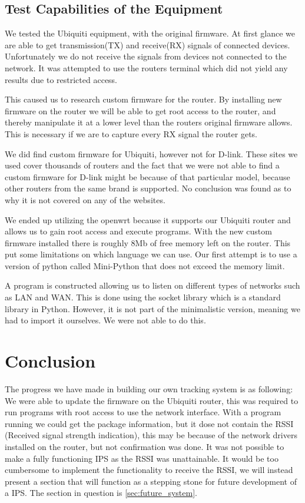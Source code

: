 \subsection*{Test Capabilities of the Equipment}
We tested the Ubiquiti equipment, with the original firmware. At first glance we are able to get transmission(TX) and receive(RX) signals of connected devices. Unfortunately we do not receive the signals from devices not connected to the network. It was attempted to use the routers terminal which did not yield any results due to restricted access.

This caused us to research custom firmware for the router. By installing new firmware on the router we will be able to get root access to the router, and thereby manipulate it at a lower level than the routers original firmware allows. This is necessary if we are to capture every RX signal the router gets.

We did find custom firmware for Ubiquiti, however not for D-link. These sites we used cover thousands of routers and the fact that we were not able to find a custom firmware for D-link might be because of that particular model, because other routers from the same brand is supported. No conclusion was found as to why it is not covered on any of the websites\cite{firmware_1}\cite{firmware_2}\cite{firmware_3}\cite{firmware_4}\cite{firmware_5}\cite{firmware_6}.

We ended up utilizing the openwrt because it supports our Ubiquiti router and allows us to gain root access and execute programs. With the new custom firmware installed there is roughly 8Mb of free memory left on the router. This put some limitations on which language we can use. Our first attempt is to use a version of python called Mini-Python that does not exceed the memory limit.

A program is constructed allowing us to listen on different types of networks such as LAN and WAN. This is done using the socket library which is a standard library in Python. However, it is not part of the minimalistic version, meaning we had to import it ourselves. We were not able to do this.

\section*{Conclusion}
The progress we have made in building our own tracking system is as following: We were able to update the firmware on the Ubiquiti router, this was required to run programs with root access to use the network interface. With a program running we could get the package information, but it dose not contain the RSSI (Received signal strength indication), this may be because of the network drivers installed on the router, but not confirmation was done. It was not possible to make a fully functioning IPS as the RSSI was unattainable. It would be too cumbersome to implement the functionality to receive the RSSI, we will instead present a section that will function as a stepping stone for future development of a IPS. The section in question is \cref{sec:future_system}.